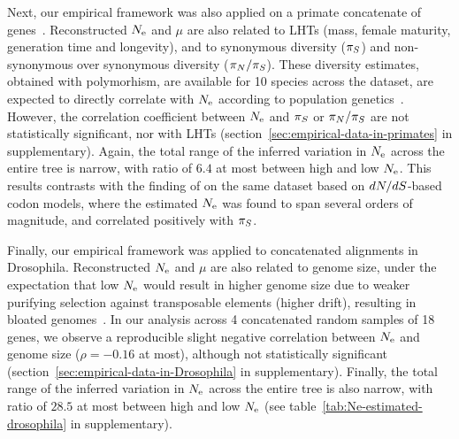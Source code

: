 
Next, our empirical framework was also applied on a primate concatenate of genes~\citep{Brevet2019}.
Reconstructed $N_{\text{e}}$ and $\mu$ are also related to LHTs (mass, female maturity, generation time and longevity), and to synonymous diversity ($\pi_S$) and non-synonymous over synonymous diversity ($\pi_N / \pi_S$).
These diversity estimates, obtained with polymorhism, are available for 10 species across the dataset, are expected to directly correlate with $N_{\text{e}}$ according to population genetics~\citep{Eyre-walker2007, Galtier2016}.
However, the correlation coefficient between $N_{\text{e}}$ and $\pi_S$ or $\pi_N / \pi_S$ are not statistically significant, nor with LHTs (section~\ref{sec:empirical-data-in-primates} in supplementary).
Again, the total range of the inferred variation in $N_{\text{e}}$ across the entire tree is narrow, with ratio of $6.4$ at most between high and low $N_{\text{e}}$.
This results contrasts with the finding of \citet{Brevet2019} on the same dataset based on $dN/dS$-based codon models, where the estimated $N_{\text{e}}$ was found to span several orders of magnitude, and correlated positively with $\pi_S$.

Finally, our empirical framework was applied to concatenated alignments in Drosophila.
Reconstructed $N_{\text{e}}$ and $\mu$ are also related to genome size, under the expectation that low $N_{\text{e}}$ would result in higher genome size due to weaker purifying selection against transposable elements (higher drift), resulting in bloated genomes~\citep{Kidwell2002}.
In our analysis across 4 concatenated random samples of 18 genes, we observe a reproducible slight negative correlation between $N_{\text{e}}$ and genome size ($\rho=-0.16$ at most), although not statistically significant (section~\ref{sec:empirical-data-in-Drosophila} in supplementary).
Finally, the total range of the inferred variation in $N_{\text{e}}$ across the entire tree is also narrow, with ratio of $28.5$ at most between high and low $N_{\text{e}}$ (see table~\ref{tab:Ne-estimated-drosophila} in supplementary).

